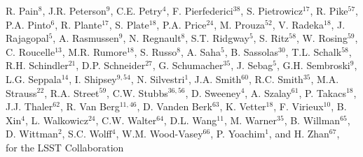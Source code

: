 {R. Pain$^{8}$,
J.R. Peterson$^{9}$,
C.E. Petry$^{4}$,  
F. Pierfederici$^{38}$,
S. Pietrowicz$^{17}$,
R. Pike$^{57}$,
P.A. Pinto$^{6}$,   
R. Plante$^{17}$,
S. Plate$^{18}$, 
P.A. Price$^{24}$,
M. Prouza$^{52}$,
V. Radeka$^{18}$, 
J. Rajagopal$^5$,   
A. Rasmussen$^9$,
N. Regnault$^8$,  
S.T. Ridgway$^5$, 
S. Ritz$^{58}$, 
W. Rosing$^{59}$,
C. Roucelle$^{13}$, 
M.R. Rumore$^{18}$, 
S. Russo$^8$,  
A. Saha$^{5}$,     
B. Sassolas$^{30}$, 
T.L. Schalk$^{58}$,     
R.H. Schindler$^{21}$,
D.P. Schneider$^{27}$,    
G. Schumacher$^{35}$,
J. Sebag$^5$,
G.H. Sembroski$^9$, 
L.G. Seppala$^{14}$,
I. Shipsey$^{9,54}$,
N. Silvestri$^1$,
J.A. Smith$^{60}$,    
R.C. Smith$^{35}$,
M.A. Strauss$^{22}$,  
R.A. Street$^{59}$,   
C.W. Stubbs$^{36,56}$,
D. Sweeney$^4$,
A. Szalay$^{61}$,
P. Takacs$^{18}$, 
J.J. Thaler$^{62}$,
R. Van Berg$^{11,46}$, 
D. Vanden Berk$^{63}$,  
K. Vetter$^{18}$, 
F. Virieux$^{10}$, 
B. Xin$^4$,
L. Walkowicz$^{24}$,
C.W. Walter$^{64}$, 
D.L. Wang$^{11}$,
M. Warner$^{35}$,
B. Willman$^{65}$,
D. Wittman$^2$,
S.C. Wolff$^4$, 
W.M. Wood-Vasey$^{66}$,  
P. Yoachim$^1$,
and H. Zhan$^{67}$, \\
for the LSST Collaboration
}
\affil{}

